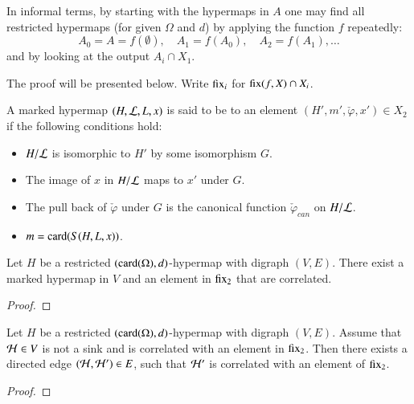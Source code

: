 In informal terms, by starting with the  hypermaps in $A$
one may find all restricted hypermaps (for given $\Omega$ and $d$) by
applying the function $f$ repeatedly:
\begin{displaymath}
A_0 = A = f(\emptyset),\quad A_1 = f(A_0),\quad A_2 = f(A_1),\ldots
\end{displaymath}
and by looking at the output $A_i \cap X_1$.
%

The proof will be presented below.
Write ${\operatorname{fix}}_i$ for ${\operatorname{fix}}(f,X)\cap X_i$.


\begin{definition}[correlated]
  A marked hypermap $(H,{\cal L},L,x)$ is said to be
   to an element $(H',m',\check\varphi,x')\in X_2$ if
  the following conditions hold:
\begin{itemize}
\item $H/{\cal L}$ is isomorphic to $H'$ by some isomorphism $G$.
\item The image of $x$ in $H/{\cal L}$ maps to $x'$ under $G$.
\item The pull back of $\check\varphi$ under $G$ is the canonical function
$\check\varphi_{can}$ on $H/{\cal L}$.
\item $m = {\operatorname{card}}(S(H,L,x))$.
\end{itemize}
\end{definition}

\begin{lemma}\label{lemma:correlated-seed}
  Let $H$ be a restricted $({\operatorname{card}}(\Omega),d)$-hypermap with digraph
  $(V,E)$.  There exist a marked hypermap in
  $V$ and an element in ${\operatorname{fix}}_2$ that are
  correlated.
\end{lemma}

\begin{proof}
\end{proof}

\begin{lemma}\label{lemma:correlated-edge}
  Let $H$ be a restricted $({\operatorname{card}}(\Omega),d)$-hypermap with digraph $(V,E)$. 
  Assume that ${\cal H}\in V$ is not a
  sink and is correlated with an element in ${\operatorname{fix}}_2$.
  Then there exists a directed edge  $({\cal H},{\cal H}')\in E$, such that
 $\cal H'$ is correlated with an element of  ${\operatorname{fix}}_2$.
\end{lemma}

\begin{proof}
\end{proof}

